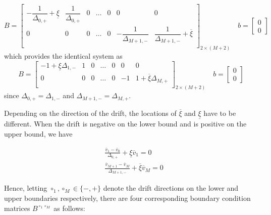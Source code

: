 \documentclass[11pt]{article}
\theoremstyle{definition}
\begin{document}
\begin{equation}\label{eq:mixed-barrier-matrix-original}
B = \begin{bmatrix}
-\dfrac{1}{\Delta_{0,+}} + \underline{\xi} & \dfrac{1}{\Delta_{0,+}} & 0 & \dots & 0 & 0 & 0 \\
0 & 0 & 0 & \dots & 0 & -\dfrac{1}{\Delta_{M+1,-}} & \dfrac{1}{\Delta_{M+1,-}} + \overline{\xi}\\
\end{bmatrix}_{2 \times (M+2)} \quad
b = \begin{bmatrix}
0 \\
0
\end{bmatrix}
\end{equation}
which provides the identical system as
\begin{equation}\label{eq:mixed-barrier-matrix}
B = \begin{bmatrix}
-1 +  \underline{\xi} \Delta_{1,-} & 1 & 0 & \dots & 0 & 0 & 0 \\
0 & 0 & 0 & \dots & 0 & -1 & 1 + \overline{\xi} \Delta_{M,+}\\
\end{bmatrix}_{2 \times (M+2)} \quad
b = \begin{bmatrix}
0 \\
0
\end{bmatrix}
\end{equation}
since $\Delta_{0,+} = \Delta_{1,-}$ and $\Delta_{M+1,-} = \Delta_{M,+}$.

Depending on the direction of the drift, the locations of $\overline{\xi}$ and $\underline{\xi}$ have to be different. When the drift is negative on the lower bound and is positive on the upper bound, we have

\begin{align}
&\frac{\overline{v}_1 - \overline{v}_0}{\Delta_{0,+}} + \underline{\xi} \overline{v}_1 = 0 \label{eq:mixed-BC1-irregular-grid-negative}  \\
&\frac{\overline{v}_{M+1} - \overline{v}_M}{\Delta_{M+1,-}} + \overline{\xi} \overline{v}_{M} = 0 \label{eq:mixed-BC2-irregular-grid-positive}
\end{align}

Hence, letting $\circ_1, \circ_M \in \{-, +\}$ denote the drift directions on the lower and upper boundaries respectively, there are four corresponding boundary condition matrices $B^{\circ_1 \circ_M}$ as follows:
\end{document}
